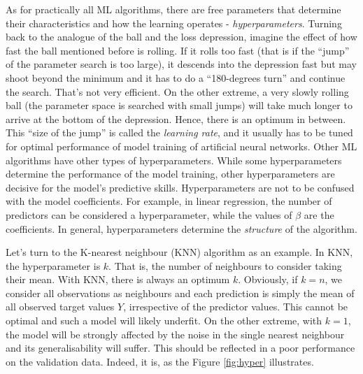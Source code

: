 \documentclass[
]{book}
\begin{document}
As for practically all ML algorithms, there are free parameters that determine their characteristics and how the learning operates - \emph{hyperparameters}. Turning back to the analogue of the ball and the loss depression, imagine the effect of how fast the ball mentioned before is rolling. If it rolls too fast (that is if the ``jump'' of the parameter search is too large), it descends into the depression fast but may shoot beyond the minimum and it has to do a ``180-degrees turn'' and continue the search. That's not very efficient. On the other extreme, a very slowly rolling ball (the parameter space is searched with small jumps) will take much longer to arrive at the bottom of the depression. Hence, there is an optimum in between. This ``size of the jump'' is called the \emph{learning rate}, and it usually has to be tuned for optimal performance of model training of artificial neural networks. Other ML algorithms have other types of hyperparameters. While some hyperparameters determine the performance of the model training, other hyperparameters are decisive for the model's predictive skills. Hyperparameters are not to be confused with the model coefficients. For example, in linear regression, the number of predictors can be considered a hyperparameter, while the values of \(\beta\) are the coefficients. In general, hyperparameters determine the \emph{structure} of the algorithm.

Let's turn to the K-nearest neighbour (KNN) algorithm as an example. In KNN, the hyperparameter is \(k\). That is, the number of neighbours to consider taking their mean. With KNN, there is always an optimum \(k\). Obviously, if \(k = n\), we consider all observations as neighbours and each prediction is simply the mean of all observed target values \(Y\), irrespective of the predictor values. This cannot be optimal and such a model will likely underfit. On the other extreme, with \(k = 1\), the model will be strongly affected by the noise in the single nearest neighbour and its generalisability will suffer. This should be reflected in a poor performance on the validation data. Indeed, it is, as the Figure \ref{fig:hyper} illustrates.
\end{document}
